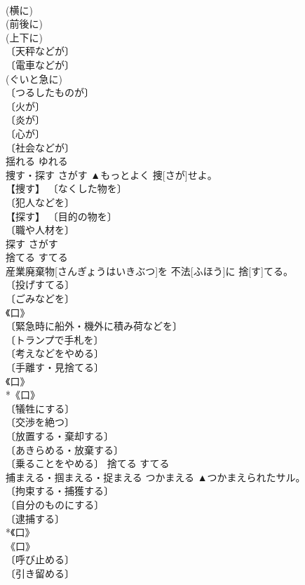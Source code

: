 \documentclass[8pt]{extreport}
\begin{document}
\begin{CJK}{UTF8}{min}
\\	(横に) 
\\	(前後に) 
\\	(上下に) 
\\	〔天秤などが〕 
\\	〔電車などが〕 
\\	(ぐいと急に) 
\\	〔つるしたものが〕 
\\	〔火が〕 
\\	〔炎が〕 
\\	〔心が〕 
\\	〔社会などが〕 
\\	揺れる	ゆれる	
\\	捜す・探す	さがす	▲もっとよく 捜[さが]せよ。	
\\	【捜す】 〔なくした物を〕 
\\	〔犯人などを〕 
\\	【探す】 〔目的の物を〕 
\\	〔職や人材を〕 
\\	探す	さがす	
\\	捨てる	すてる	
\\	産業廃棄物[さんぎょうはいきぶつ]を 不法[ふほう]に 捨[す]てる。	
\\	〔投げすてる〕 
\\	〔ごみなどを〕 
\\	《口》 
\\	〔緊急時に船外・機外に積み荷などを〕 
\\	〔トランプで手札を〕 
\\	〔考えなどをやめる〕 
\\	〔手離す・見捨てる〕 
\\	《口》 
\\	*《口》 
\\	〔犠牲にする〕 
\\	〔交渉を絶つ〕 
\\	〔放置する・棄却する〕 
\\	〔あきらめる・放棄する〕 
\\	〔乗ることをやめる〕	捨てる	すてる	
\\	捕まえる・掴まえる・捉まえる	つかまえる	▲つかまえられたサル。	
\\	〔拘束する・捕獲する〕 
\\	〔自分のものにする〕 
\\	〔逮捕する〕 
\\	*《口》 
\\	《口》 
\\	〔呼び止める〕 
\\	〔引き留める〕 

\end{CJK}
\end{document}
